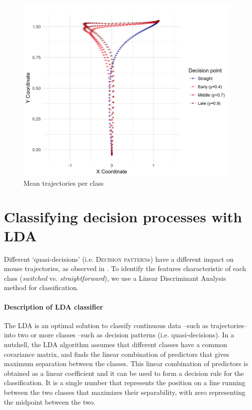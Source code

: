 \documentclass{article}
\begin{document}
\begin{figure}
\centering
\includegraphics[width=\textwidth]{calibration_mean_trajectory_pointchang.png}
\caption{Mean trajectories per class}\label{fig:mean.trajectories.calibration}
\end{figure}

\section{Classifying decision processes with LDA}
\label{section:LDA}
Different `quasi-decisions' (i.e. \textsc{Decision pattern}s) have a different impact on mouse trajectories, as observed in . To identify the features characteristic of each class (\textit{switched} vs. \textit{straightforward}), we use a Linear Discriminant Analysis method for classification. 

\paragraph{Description of LDA classifier}
The LDA is an optimal solution to classify continuous data --such as trajectories-- into two or more classes --such as decision patterns (i.e. quasi-decisions). In a nutshell, the LDA algorithm assumes that different classes have a common covariance matrix, and finds the linear combination of predictors that gives maximum separation between the classes. This linear combination of predictors is obtained as a linear coefficient and it can be used to form a decision rule for the classification.  It is a single number that represents the position  on a line running between the two classes that maximizes their separability, with zero representing the midpoint between the two.
 
\end{document}
